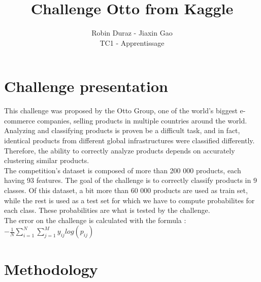 \documentclass[12pt]{article}
\begin{document}
 
 
\title{Challenge Otto from Kaggle}%
\author{Robin Duraz - Jiaxin Gao\\ %
TC1 - Apprentissage} %
 
\maketitle
\vspace{2cm}
\section{Challenge presentation}

This challenge was proposed by the Otto Group, one of the world’s biggest
e-commerce companies, selling products in multiple countries around the world.
Analyzing and classifying products is proven be a difficult task, and in fact,
identical products from different global infrastructures were classified
differently. \\
Therefore, the ability to correctly analyze products depends on accurately
clustering similar products.\\

The competition's dataset is composed of more than 200 000 products, each having
93 features. The goal of the challenge is to correctly classify products in 9
classes. Of this dataset, a bit more than 60 000 products are used as train set,
while the rest is used as a test set for which we have to compute probabilites
for each class. These probabilities are what is tested by the challenge.\\

The error on the challenge is calculated with the formula : \\
$-\frac{1}{N}\sum\limits_{i = 1}^N\sum\limits_{j = 1}^M y_{ij}log(p_{ij})$

\section{Methodology}
\end{document}
